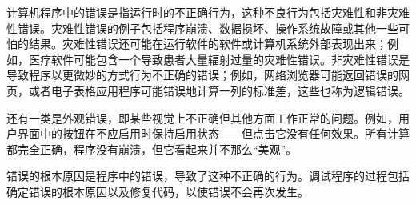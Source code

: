 计算机程序中的错误是指运行时的不正确行为，这种不良行为包括灾难性和非灾难性错误。灾难性错误的例子包括程序崩溃、数据损坏、操作系统故障或其他一些可怕的结果。灾难性错误还可能在运行软件的软件或计算机系统外部表现出来；例如，医疗软件可能包含一个导致患者大量辐射过量的灾难性错误。非灾难性错误是导致程序以更微妙的方式行为不正确的错误；例如，网络浏览器可能返回错误的网页，或者电子表格应用程序可能错误地计算一列的标准差，这些也称为逻辑错误。

还有一类是外观错误，即某些视觉上不正确但其他方面工作正常的问题。例如，用户界面中的按钮在不应启用时保持启用状态——但点击它没有任何效果。所有计算都完全正确，程序没有崩溃，但它看起来并不那么“美观”。

错误的根本原因是程序中的错误，导致了这种不正确的行为。调试程序的过程包括确定错误的根本原因以及修复代码，以使错误不会再次发生。












